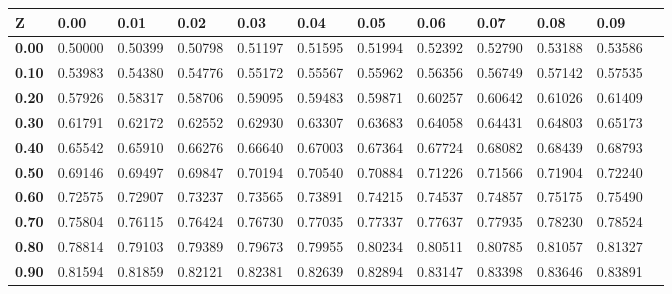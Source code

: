 \documentclass[a4paper]{article}
\begin{document}

\begin{tabular}{l|lllllllllll}
\hline
{\bfseries Z}& \bfseries      0.00&\bfseries      0.01&\bfseries      0.02&\bfseries      0.03&\bfseries      0.04&\bfseries      0.05&\bfseries      0.06&\bfseries      0.07&\bfseries      0.08&\bfseries      0.09&\\ \hline 
\bfseries  0.00&   0.50000&   0.50399&   0.50798&   0.51197&   0.51595&   0.51994&   0.52392&   0.52790&   0.53188&   0.53586&\\
\bfseries  0.10&   0.53983&   0.54380&   0.54776&   0.55172&   0.55567&   0.55962&   0.56356&   0.56749&   0.57142&   0.57535&\\
\bfseries  0.20&   0.57926&   0.58317&   0.58706&   0.59095&   0.59483&   0.59871&   0.60257&   0.60642&   0.61026&   0.61409&\\ 
\bfseries  0.30&   0.61791&   0.62172&   0.62552&   0.62930&   0.63307&   0.63683&   0.64058&   0.64431&   0.64803&   0.65173&\\
\bfseries  0.40&   0.65542&   0.65910&   0.66276&   0.66640&   0.67003&   0.67364&   0.67724&   0.68082&   0.68439&   0.68793&\\ \hline 
\bfseries  0.50&   0.69146&   0.69497&   0.69847&   0.70194&   0.70540&   0.70884&   0.71226&   0.71566&   0.71904&   0.72240&\\
\bfseries  0.60&   0.72575&   0.72907&   0.73237&   0.73565&   0.73891&   0.74215&   0.74537&   0.74857&   0.75175&   0.75490&\\
\bfseries  0.70&   0.75804&   0.76115&   0.76424&   0.76730&   0.77035&   0.77337&   0.77637&   0.77935&   0.78230&   0.78524&\\ 
\bfseries  0.80&   0.78814&   0.79103&   0.79389&   0.79673&   0.79955&   0.80234&   0.80511&   0.80785&   0.81057&   0.81327&\\
\bfseries  0.90&   0.81594&   0.81859&   0.82121&   0.82381&   0.82639&   0.82894&   0.83147&   0.83398&   0.83646&   0.83891&\\ \hline

\end{tabular}
\end{document}
